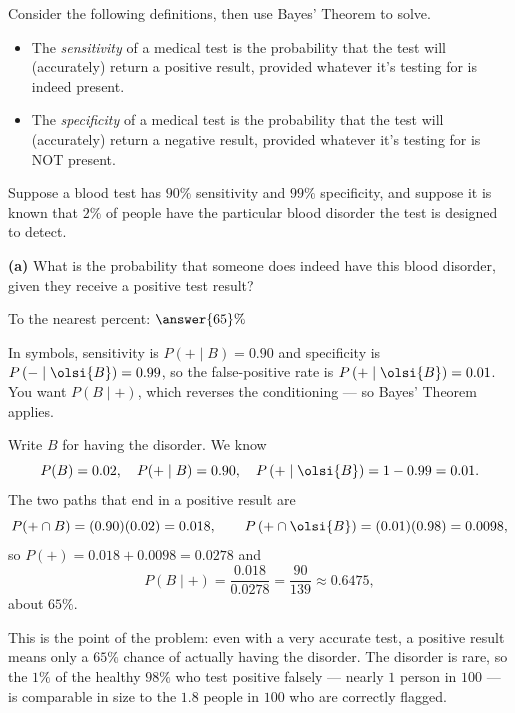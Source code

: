 \documentclass[12pt]{ximera}
\begin{document}
\begin{problem}
Consider the following definitions, then use Bayes' Theorem to solve.
\begin{itemize}
    \item The \emph{sensitivity} of a medical test is the probability that the test
      will (accurately) return a positive result, provided whatever it's testing for
      is indeed present.
    \item The \emph{specificity} of a medical test is the probability that the test
      will (accurately) return a negative result, provided whatever it's testing for
      is NOT present.
\end{itemize}

Suppose a blood test has $90\%$ sensitivity and $99\%$ specificity, and suppose it is
known that $2\%$ of people have the particular blood disorder the test is designed to
detect.

\begin{prompt}
\textbf{(a)} What is the probability that someone does indeed have this blood
disorder, given they receive a positive test result?

To the nearest percent: $\answer{65}\%$

\begin{hint}
In symbols, sensitivity is $P(+\mid B)=0.90$ and specificity is
$P\left(-\mid\olsi{B}\right)=0.99$, so the false-positive rate is
$P\left(+\mid\olsi{B}\right)=0.01$. You want $P(B\mid +)$, which reverses the
conditioning --- so Bayes' Theorem applies.
\end{hint}

\begin{solution}
Write $B$ for having the disorder. We know
\[
P(B)=0.02,\quad P(+\mid B)=0.90,\quad P\left(+\mid\olsi{B}\right)=1-0.99=0.01.
\]
The two paths that end in a positive result are
\[
P(+\cap B)=(0.90)(0.02)=0.018, \qquad
P\left(+\cap\olsi{B}\right)=(0.01)(0.98)=0.0098,
\]
so $P(+)=0.018+0.0098=0.0278$ and
\[
P(B\mid +)=\frac{0.018}{0.0278}=\frac{90}{139}\approx 0.6475,
\]
about $65\%$.

This is the point of the problem: even with a very accurate test, a positive result
means only a $65\%$ chance of actually having the disorder. The disorder is rare, so
the $1\%$ of the healthy $98\%$ who test positive falsely --- nearly $1$ person in
$100$ --- is comparable in size to the $1.8$ people in $100$ who are correctly
flagged.
\end{solution}
\end{prompt}


\end{problem}
\end{document}
